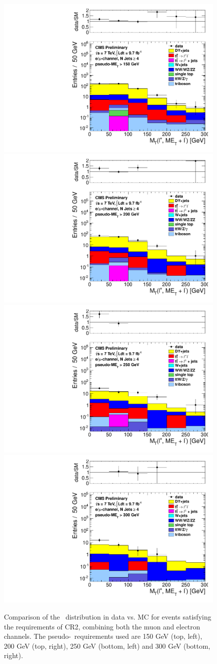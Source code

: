 \begin{figure}[hbt]
  \begin{center}
	\includegraphics[width=0.5\linewidth]{plots/CR2plots/mt_lepcor_scaled_met150_nj4_emucomb.pdf}%
	\includegraphics[width=0.5\linewidth]{plots/CR2plots/mt_lepcor_scaled_met200_nj4_emucomb.pdf}
	\includegraphics[width=0.5\linewidth]{plots/CR2plots/mt_lepcor_scaled_met250_nj4_emucomb.pdf}%
	\includegraphics[width=0.5\linewidth]{plots/CR2plots/mt_lepcor_scaled_met300_nj4_emucomb.pdf}
    \caption{
      Comparison of the \mt\ distribution in data vs. MC for events
      satisfying the requirements of CR2, combining both the muon and
      electron channels. The pseudo-\met\ requirements used are
      150 GeV (top, left), 200 GeV (top, right), 250 GeV (bottom,
      left) and 300 GeV (bottom, right).
\label{fig:cr2mtrest} 
}  
      \end{center}
\end{figure}
\clearpage